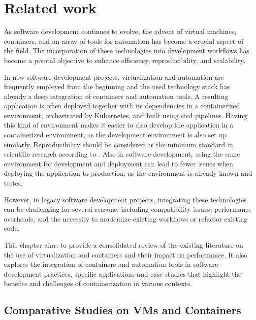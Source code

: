\chapter{Related work}
\label{ch:related_work}


As software development continues to evolve, the advent of virtual machines, containers, and an array of tools for automation has become a crucial aspect of the field.
The incorporation of these technologies into development workflows has become a pivotal objective to enhance efficiency, reproducibility, and scalability.

In new software development projects, virtualization and automation are frequently employed from the beginning and the used technology stack has already a deep integration of containers and automation tools.
A resulting application is often deployed together with its dependencies in a containerized environment, orchestrated by Kubernetes, and built using \ac{cicd} pipelines.
Having this kind of environment makes it easier to also develop the application in a containerized environment, as the development environment is also set up similarly.
Reproducibility should be considered as the minimum standard in scientific research according to \citet{pengReproducibleResearchComputational2011}.
Also in software development, using the same environment for development and deployment can lead to fewer issues when deploying the application to production, as the environment is already known and tested.

However, in legacy software development projects, integrating these technologies can be challenging for several reasons, including compatibility issues, performance overheads, and the necessity to modernize existing workflows or refactor existing code.

This chapter aims to provide a consolidated review of the existing literature on the use of virtualization and containers and their impact on performance.
It also explores the integration of containers and automation tools in software development practices, specific applications and case studies that highlight the benefits and challenges of containerization in various contexts.


\section{Comparative Studies on VMs and Containers}

